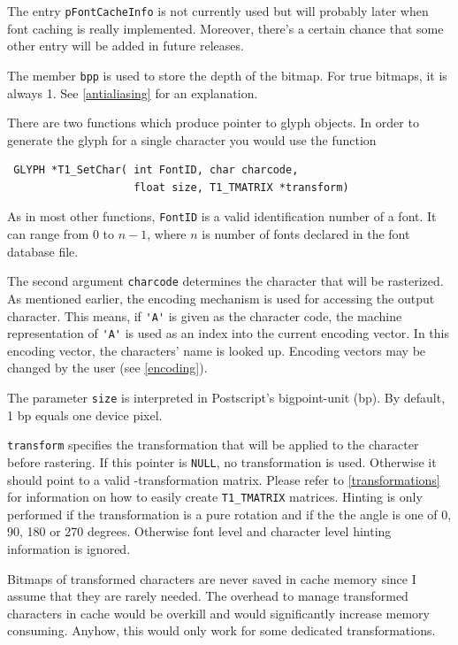 The entry \verb+pFontCacheInfo+ is not currently used but will
probably later when font caching is really
implemented. Moreover, there's a certain chance that some other
entry will be added in future releases.

The member \verb+bpp+ is used to store the depth of the bitmap. For
true bitmaps, it is always 1. See \ref{antialiasing} for an
explanation. 

There are two functions which produce pointer to glyph objects. In
order to generate the glyph for a single character you would use the
function 
\precorr 
\begin{verbatim}
 GLYPH *T1_SetChar( int FontID, char charcode, 
                    float size, T1_TMATRIX *transform)
\end{verbatim}\postcorr
As in most other functions, \verb+FontID+ is a valid identification
number of a font. It can range from 0 to $n-1$, where $n$ is number of
fonts declared in the font database file.

The second argument \verb+charcode+ determines the character that will
be rasterized.
As mentioned earlier, the encoding mechanism is used for
accessing the output character. This means, if \verb+'A'+ is given as
the character code, the machine representation of \verb+'A'+ is used
as an index into the current encoding vector. In this encoding vector,
the characters' name is looked up. Encoding vectors may be changed by
the user (see \ref{encoding}).


The parameter \verb+size+ is interpreted in Postscript's bigpoint-unit
(bp). By default, 
1 bp equals one device pixel. 

\verb+transform+ specifies the transformation that will be applied to the
character before rastering. If this pointer is \verb+NULL+, no transformation
is used. Otherwise it should point to a valid \tonelib-transformation matrix.
Please refer to \ref{transformations} for information on how to easily create
\verb+T1_TMATRIX+ matrices.
Hinting is only performed if the transformation is a pure rotation and if the
the angle is one of 0, 90, 180 or 270 degrees. Otherwise font level and
character level hinting information is ignored.

Bitmaps of transformed characters are never saved in
cache memory since I assume that they are rarely needed. The overhead
to manage transformed characters in cache would be overkill and would
significantly increase memory consuming. Anyhow, this would only work
for some dedicated transformations.

